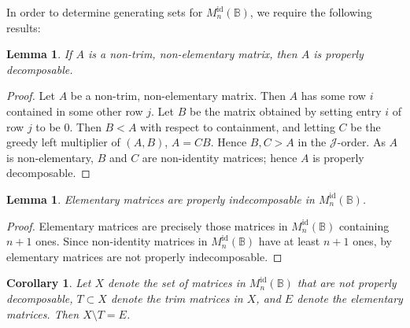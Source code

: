 \documentclass[11pt]{article}
\newtheorem{cor}[thm]{Corollary}
\newtheorem{lemma}[thm]{Lemma}
\numberwithin{equation}{section}
\newcommand{\B}{\mathbb{B}}
\newcommand{\Refn}{M_n^{\text{id}}(\B)}
\newcommand{\J}{\mathscr{J}}
\begin{document}
In order to determine generating sets for $\Refn$, we require the following results:

\begin{lemma}
  If $A$ is a non-trim, non-elementary matrix, then $A$ is properly
  decomposable.
\end{lemma}
\begin{proof}
Let $A$ be a non-trim, non-elementary matrix. Then $A$ has some row $i$
contained in some other row $j$. Let $B$ be the matrix obtained by setting entry
$i$ of row $j$ to be $0$. Then $B < A$ with respect to  containment, and letting
$C$ be the greedy left multiplier of $(A, B)$, $A = CB$. Hence $B, C > A$ in the
$\J$-order. As $A$ is non-elementary, $B$ and $C$ are non-identity matrices;
hence $A$ is properly decomposable.
\end{proof}

\begin{lemma}
  Elementary matrices are properly indecomposable in $\Refn$.
\end{lemma}
\begin{proof}
  Elementary matrices are precisely those matrices in $\Refn$ containing $n + 1$
  ones. Since non-identity matrices in $\Refn$ have at least $n + 1$ ones, by
   elementary matrices are not properly
  indecomposable.
\end{proof}

\begin{cor}
  Let $X$ denote the set of matrices in $\Refn$ that are not properly
  decomposable, $T \subset X$ denote the trim matrices in $X$, and $E$ denote
  the elementary matrices. Then $X \setminus T = E$. 
\end{cor}
\end{document}
